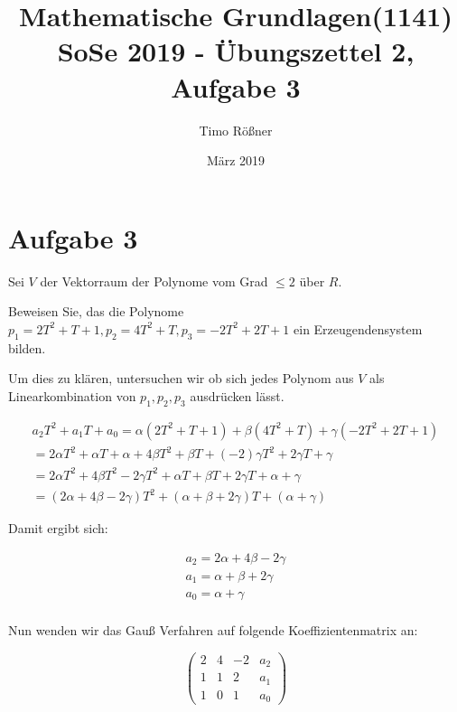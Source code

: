 \documentclass{article}
\title{Mathematische Grundlagen(1141) SoSe 2019 - Übungszettel 2, Aufgabe 3}
\author{Timo Rößner }
\date{März 2019}
\begin{document}
\maketitle

\section*{Aufgabe 3}


Sei \(V\) der Vektorraum der Polynome vom Grad \(\leq 2\) über \(R\).

Beweisen Sie, das die Polynome \(p_{1} = 2T^2 + T + 1, p_{2} = 4T^2 + T, p_{3} = - 2T^2 + 2T + 1\) ein Erzeugendensystem bilden.

Um dies zu klären, untersuchen wir ob sich jedes Polynom aus \(V\) als Linearkombination von \(p_{1}, p_{2}, p_{3}\) ausdrücken lässt.

\[
\begin{split}
a_{2}T^2 + a_{1}T + a_{0} = \alpha(2T^2 + T + 1) + \beta(4T^2 + T) + \gamma(-2T^2 + 2T + 1) \\
= 2 \alpha T^2 + \alpha T + \alpha + 4\beta T^2 + \beta T + (-2)\gamma T^2 + 2\gamma T + \gamma \\
= 2 \alpha T^2 + 4\beta T^2 -2\gamma T^2 + \alpha T + \beta T + 2\gamma T + \alpha  + \gamma \\
= (2 \alpha + 4\beta -2\gamma) T^2 + (\alpha + \beta + 2\gamma) T + (\alpha  + \gamma)
\end{split}
\]

Damit ergibt sich:

\[
\begin{split}
a_{2} = 2 \alpha + 4 \beta - 2\gamma \\
a_{1} = \alpha + \beta + 2\gamma \\
a_{0} = \alpha + \gamma \\
\end{split}
\]

Nun wenden wir das Gauß Verfahren auf folgende Koeffizientenmatrix an:

\[
\left (
\begin{array}{ccc|c}
  2 & 4 & -2 & a_{2} \\
  1 & 1 & 2 & a_{1} \\
  1 & 0 & 1 & a_{0}
\end{array}
\right )
\]
\end{document}
